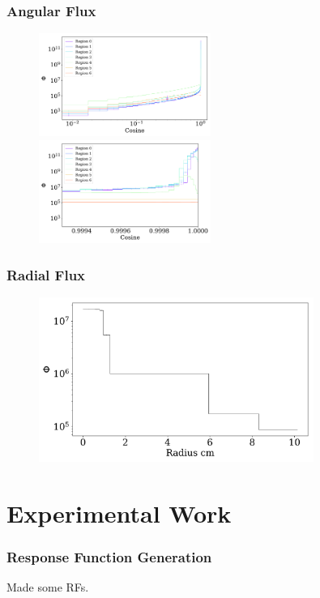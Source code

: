 \documentclass[fleqn]{beamer}
\begin{document}
\begin{frame}
\frametitle{Angular Flux}

\begin{figure}
\centering
\includegraphics[width = 0.5\textwidth]{flux_rad_cos}
\includegraphics[width = 0.5\textwidth]{flux_rad_cos_detail}
\caption{}
\end{figure}

\end{frame}

\begin{frame}
\frametitle{Radial Flux}

\begin{figure}
\centering
\includegraphics[width = 0.8\textwidth]{flux_rad}
\caption{}
\end{figure}

\end{frame}

\section{Experimental Work}
\begin{frame}
\frametitle{Response Function Generation}

Made some RFs.

\end{frame}
\end{document}
